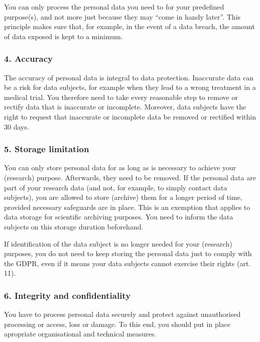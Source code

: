 \documentclass[
]{book}
\begin{document}
You can only process the personal data you need to for your predefined purpose(s),
and not more just because they may ``come in handy later''. This principle makes
sure that, for example, in the event of a data breach, the amount of data exposed
is kept to a minimum.

\hypertarget{accuracy}{%
\subsubsection{4. Accuracy}\label{accuracy}}

The accuracy of personal data is integral to data protection. Inaccurate data
can be a risk for data subjects, for example when they lead to a wrong treatment
in a medical trial. You therefore need to take every reasonable step to remove
or rectify data that is inaccurate or incomplete. Moreover, data subjects have
the right to request that inaccurate or
incomplete data be removed or rectified within 30 days.

\hypertarget{storage-limitation}{%
\subsubsection{5. Storage limitation}\label{storage-limitation}}

You can only store personal data for as long as is
necessary to achieve your (research) purpose. Afterwards, they need to be
removed. If the personal data are part of your research data (and not, for
example, to simply contact data subjects), you are allowed to store (archive)
them for a longer period of time, provided necessary safeguards are in place.
This is an exemption that applies to data storage for scientific archiving
purposes. You need to inform the data subjects on this storage duration beforehand.

If identification of the data subject is no longer needed for your
(research) purposes, you do not need to keep storing the personal data just
to comply with the GDPR, even if it means your data subjects cannot exercise
their rights (art. 11).

\hypertarget{integrity-and-confidentiality}{%
\subsubsection{6. Integrity and confidentiality}\label{integrity-and-confidentiality}}

You have to process personal data securely and protect against unauthorised
processing or access, loss or damage. To this end, you should put in place
apropriate organisational and technical measures.
\end{document}
